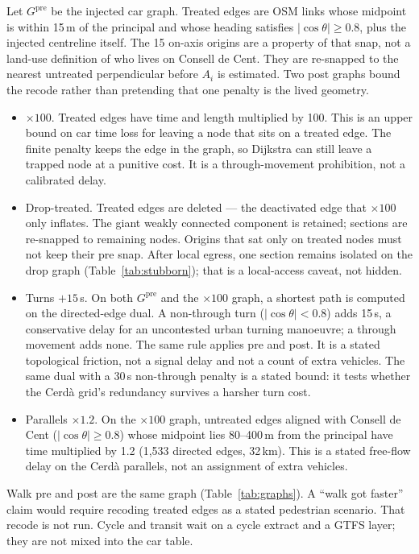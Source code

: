 \documentclass[a4paper,fleqn]{cas-dc}
\begin{document}
Let $G^{\mathrm{pre}}$ be the injected car graph. Treated edges are OSM
links whose midpoint is within 15\,m of the principal and whose heading
satisfies $|\cos\theta| \ge 0.8$, plus the injected centreline itself. The
15 on-axis origins are a property of that snap, not a land-use definition of
who lives on Consell de Cent. They are re-snapped to the nearest untreated
perpendicular before $A_i$ is estimated. Two post graphs bound the recode rather than
pretending that one penalty is the lived geometry.

\begin{itemize}
\item $\times 100$. Treated edges have time and length multiplied
by 100. This is an upper bound on car time loss for leaving a node
that sits on a treated edge. The finite penalty keeps the edge in the graph,
so Dijkstra can still leave a trapped node at a punitive cost. It is a
through-movement prohibition, not a calibrated delay.
\item Drop-treated. Treated edges are deleted --- the deactivated
edge that $\times 100$ only inflates. The giant weakly
connected component is retained; sections are re-snapped to
remaining nodes. Origins that sat only on treated nodes must not keep their
pre snap. After local egress, one section remains isolated on the drop graph
(Table~\ref{tab:stubborn}); that is a local-access caveat, not hidden.
\item Turns $+15$\,s. On both $G^{\mathrm{pre}}$ and the
$\times 100$ graph, a shortest path is computed on the directed-edge dual.
A non-through turn ($|\cos\theta| < 0.8$) adds 15\,s, a conservative delay
for an uncontested urban turning manoeuvre; a through movement adds none. The same rule applies pre and post. It is a stated topological
friction, not a signal delay and not a count of extra vehicles. The same
dual with a 30\,s non-through penalty is a stated bound: it tests whether
the Cerd\`a grid's redundancy survives a harsher turn cost.
\item Parallels $\times 1.2$. On the $\times 100$ graph, untreated
edges aligned with Consell de Cent ($|\cos\theta|\ge 0.8$) whose midpoint
lies 80--400\,m from the principal have time multiplied by 1.2 (1{,}533
directed edges, 32\,km). This is a stated free-flow delay on the Cerd\`a
parallels, not an assignment of extra vehicles.
\end{itemize}

Walk pre and post are the same graph (Table~\ref{tab:graphs}). A ``walk got
faster'' claim would require recoding treated edges as a stated pedestrian
scenario. That recode is not run. Cycle and transit wait on a cycle extract
and a GTFS layer; they are not mixed into the car table.
\end{document}
